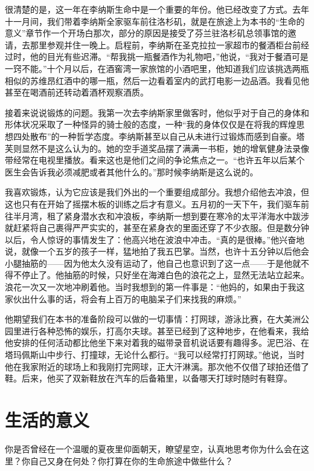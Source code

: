 很清楚的是，这一年在李纳斯生命中是一个重要的年份。他已经改变了方式。去年十一月间，我们带着李纳斯全家驱车前往洛杉矶，就是在旅途上为本书的“生命的意义”章节作一个开场白那次，部分的原因是接受了芬兰驻洛杉矶总领事馆的邀请，去那里参观并住一晚上。启程前，李纳斯在圣克拉拉一家超市的餐酒柜台前经过时，他的目光有些迟滞。“帮我挑一瓶餐酒作为礼物吧，”他说，“我对于餐酒可是一窍不能。”十个月以后，在酒窖湾一家旅馆的小酒吧里，他知道我们应该挑选两瓶相似的苏维昂红酒中的哪一瓶，然后一边看着室内的武打电影一边品酒。我看见他甚至在喝酒前还转动着酒杯观察酒质。

接着来说说锻炼的问题。我第一次去李纳斯家里做客时，他似乎对于自己的身体和形体状况采取了一种怪异的骑士般的态度，一种“我的身体仅仅是在将我的辉煌思想四处散布”的一种哲学态度。李纳斯甚至以自己从未进行过锻炼而感到自豪。塔芙则显然不是这么认为的。她的空手道奖品摆了满满一书柜，她的增氧健身法录像带经常在电视里播放。看来这也是他们之间的争论焦点之一。“也许五年以后某个医生会告诉我必须减肥或者其他什么的。”那时候李纳斯是这么说的。

我喜欢锻炼，认为它应该是我们外出的一个重要组成部分。我想介绍他去冲浪，但这也只有在开始了摇摆木板的训练之后才有意义。五月初的一天下午，我们驱车前往半月湾，租了紧身潜水衣和冲浪板，李纳斯一想到要在寒冷的太平洋海水中跋涉就赶紧将自己裹得严严实实的，甚至在紧身衣的里面还穿了不少衣服。但是数分钟以后，令人惊讶的事情发生了：他高兴地在波浪中冲击。“真的是很棒。”他兴奋地说，就像一个五岁的孩子一样，猛地拍了我五巴掌。当然，也许十五分钟以后他会小腿抽筋的——因为他太久没有运动了，他自己也意识到了这一点——于是他就不得不停止了。他抽筋的时候，只好坐在海滩白色的浪花之上，显然无法站立起来。浪花一次又一次地冲刷着他。当时我想到的第一件事是：“他妈的，如果由于我这家伙出什么事的话，将会有上百万的电脑呆子们来找我的麻烦。”

他期望我们在本书的准备阶段可以做的一切事情：打网球，游泳比赛，在大美洲公园里进行各种恐怖的娱乐，打高尔夫球。甚至已经到了这种地步，在他看来，我给他安排的任何活动都比他坐下来对着我的磁带录音机说话要有趣得多。泥巴浴、在塔玛佩斯山中步行、打撞球，无论什么都行。“我可以经常打打网球。”他说，当时他在我家附近的球场上和我刚打完网球，正大汗淋漓。那次他不仅借了球拍还借了鞋。后来，他买了双新鞋放在汽车的后备箱里，以备哪天打球时随时有鞋穿。

 
\section{生活的意义}

你是否曾经在一个温暖的夏夜里仰面朝天，瞭望星空，认真地思考你为什么会在这里？你自己又身在何处？你打算在你的生命旅途中做些什么？

